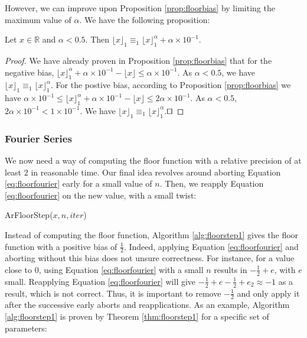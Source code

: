 \documentclass[runningheads]{llncs}
\begin{document}
However, we can improve upon Proposition \ref{prop:floorbias} by limiting the maximum value of $\alpha$. We have the following proposition:\begin{proposition}\label{prop:floorbiasopt}
  Let $x\in\mathbb{R}$ and $\alpha<\num{0.5}$. Then $\lfloor x\rfloor_1 \equiv_1 \lfloor x \rfloor_1^\alpha + \alpha\times10^{-1}$.
\end{proposition}
\begin{proof}
  We have already proven in Proposition \ref{prop:floorbias} that for the negative bias, $\lfloor x \rfloor_1^\alpha + \alpha\times 10^{-1} - \lfloor x \rfloor \leq \alpha\times 10^{-1}$. As $\alpha<0.5$, we have $\lfloor x \rfloor_1 \equiv_1 \lfloor x \rfloor_1^\alpha$. For the postive bias, according to Proposition \ref{prop:floorbias} we have $\alpha\times10^{-1} \leq \lfloor x \rfloor_1^\alpha + \alpha\times 10^{-1} - \lfloor x \rfloor \leq 2\alpha\times 10^{-1}$. As $\alpha<\num{0.5}$, $2\alpha\times 10^{-1}<1\times 10^{-1}$. We have $\lfloor x \rfloor_1 \equiv_1 \lfloor x \rfloor_1^\alpha$.\hfill $\qed$ 
\end{proof}

\subsubsection{Fourier Series}
We now need a way of computing the floor function with a relative precision of at least $2$ in reasonable time. Our final idea revolves around aborting Equation \ref{eq:floorfourier} early for a small value of $n$. Then, we reapply Equation \ref{eq:floorfourier} on the new value, with a small twist:

\begin{algorithm}[H]
  \caption{ArFloorStep($x,n,iter$)}
  \label{alg:floorstep1}
\end{algorithm}
Instead of computing the floor function, Algorithm \ref{alg:floorstep1} gives the floor function with a positive bias of $\frac{1}{2}$. Indeed, applying Equation \ref{eq:floorfourier} and aborting without this bias does not unsure correctness. For instance, for a value close to $0$, using Equation \ref{eq:floorfourier} with a small $n$ results in $-\frac{1}{2} + e$, with $e$ small. Reapplying Equation \ref{eq:floorfourier} will give $-\frac{1}{2}+e-\frac{1}{2}+e_2 \approx -1$ as a result, which is not correct. Thus, it is important to remove $-\frac{1}{2}$ and only apply it after the successive early aborts and reapplications. As an example, Algorithm \ref{alg:floorstep1} is proven by Theorem \ref{thm:floorstep1} for a specific set of parameters:
\end{document}
